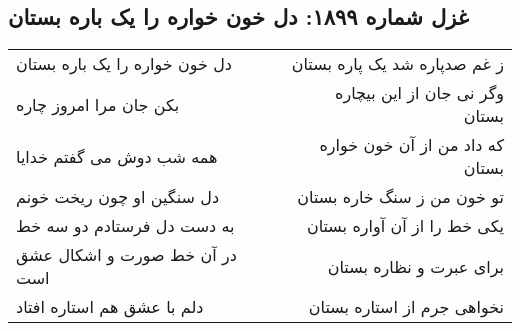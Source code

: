 \begin{center}
\section*{غزل شماره ۱۸۹۹: دل خون خواره را یک باره بستان}
\label{sec:1899}
\begin{longtable}{l p{0.5cm} r}
دل خون خواره را یک باره بستان
&&
ز غم صدپاره شد یک پاره بستان
\\
بکن جان مرا امروز چاره
&&
وگر نی جان از این بیچاره بستان
\\
همه شب دوش می گفتم خدایا
&&
که داد من از آن خون خواره بستان
\\
دل سنگین او چون ریخت خونم
&&
تو خون من ز سنگ خاره بستان
\\
به دست دل فرستادم دو سه خط
&&
یکی خط را از آن آواره بستان
\\
در آن خط صورت و اشکال عشق است
&&
برای عبرت و نظاره بستان
\\
دلم با عشق هم استاره افتاد
&&
نخواهی جرم از استاره بستان
\\
\end{longtable}
\end{center}
